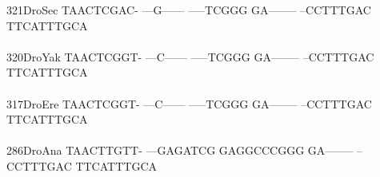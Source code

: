 \documentclass[11pt,twoside,reqno,a4paper]{article}
\begin{document}
{321\hspace*{1\charwidth}DroSec	TAACTCGAC-	---G------	-----TCGGG	GA--------	--CCTTTGAC	TTCATTTGCA	\\
\hspace*{4\charwidth}\hspace*{7\charwidth}\hspace*{1\charwidth}\hspace*{1\charwidth}\hspace*{1\charwidth}\hspace*{1\charwidth}\hspace*{1\charwidth}\hspace*{1\charwidth}\\
320\hspace*{1\charwidth}DroYak	TAACTCGGT-	---C------	-----TCGGG	GA--------	--CCTTTGAC	TTCATTTGCA	\\
\hspace*{4\charwidth}\hspace*{7\charwidth}\hspace*{1\charwidth}\hspace*{1\charwidth}\hspace*{1\charwidth}\hspace*{1\charwidth}\hspace*{1\charwidth}\hspace*{1\charwidth}\\
317\hspace*{1\charwidth}DroEre	TAACTCGGT-	---C------	-----TCGGG	GA--------	--CCTTTGAC	TTCATTTGCA	\\
\hspace*{4\charwidth}\hspace*{7\charwidth}\hspace*{1\charwidth}\hspace*{1\charwidth}\hspace*{1\charwidth}\hspace*{1\charwidth}\hspace*{1\charwidth}\hspace*{1\charwidth}\\
286\hspace*{1\charwidth}DroAna	TAACTTGTT-	---GAGATCG	GAGGCCCGGG	GA--------	--CCTTTGAC	TTCATTTGCA	\\
\hspace*{4\charwidth}\hspace*{7\charwidth}\hspace*{1\charwidth}\hspace*{1\charwidth}\hspace*{1\charwidth}\hspace*{1\charwidth}\hspace*{1\charwidth}\hspace*{1\charwidth}\\
}
\end{document}
